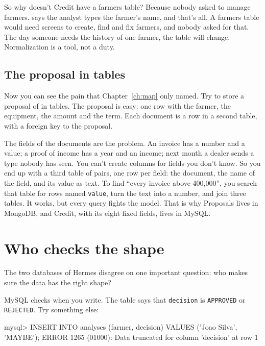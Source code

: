 \begin{question}{So why doesn't Credit have a farmers table?}
Because nobody asked to manage farmers.  says the analyst types the
farmer's name, and that's all. A farmers table would need screens to create,
find and fix farmers, and nobody asked for that. The day someone needs the
history of one farmer, the table will change. Normalization is a tool, not a
duty.
\end{question}

\subsection*{The proposal in tables}

Now you can see the pain that Chapter~\ref{ch:map} only named. Try to store
a proposal of  in tables. The proposal is easy: one row with the
farmer, the equipment, the amount and the term. Each document is a row in a
second table, with a foreign key to the proposal.

The fields of the documents are the problem. An invoice has a number and a
value; a proof of income has a year and an income; next month a dealer sends
a type nobody has seen. You can't create columns for fields you don't know.
So you end up with a third table of pairs, one row per field: the document,
the name of the field, and its value as text. To find ``every invoice above
400,000'', you search that table for rows named \texttt{value}, turn the text
into a number, and join three tables. It works, but every query fights the
model. That is why Proposals lives in MongoDB, and Credit, with its eight
fixed fields, lives in MySQL.


\section{Who checks the shape}
\label{sec:two-shape}

The two databases of Hermes disagree on one important question: who makes
sure the data has the right shape?

MySQL checks when you write. The table says that \texttt{decision} is
\texttt{APPROVED} or \texttt{REJECTED}. Try something else:

\begin{terminal}
mysql> INSERT INTO analyses (farmer, decision) VALUES ('Joao Silva', 'MAYBE');
ERROR 1265 (01000): Data truncated for column 'decision' at row 1
\end{terminal}

